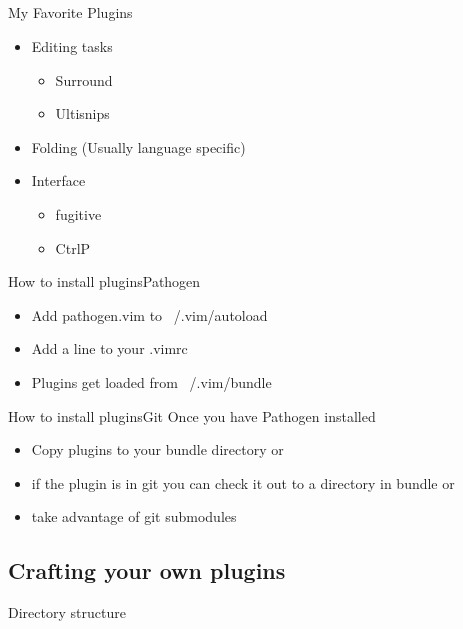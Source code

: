 \documentclass{beamer}
\begin{document}
    \subsection{}
    \begin{frame}{My Favorite Plugins}
        \begin{itemize}
            \item Editing tasks
                \begin{itemize}
                    \item Surround
                    \item Ultisnips
                \end{itemize}
            \item Folding (Usually language specific)
            \item Interface
                \begin{itemize}
                    \item fugitive
                    \item CtrlP
                \end{itemize}
        \end{itemize}
    \end{frame}
    \begin{frame}{How to install plugins}{Pathogen}
        \begin{itemize}
            \item Add pathogen.vim to ~/.vim/autoload
            \item Add a line to your .vimrc
            \item Plugins get loaded from ~/.vim/bundle
        \end{itemize}
    \end{frame}
    \begin{frame}{How to install plugins}{Git}
        Once you have Pathogen installed
        \begin{itemize}
            \item Copy plugins to your bundle directory or
            \item if the plugin is in git you can check it out to a directory in bundle or
            \item take advantage of git submodules
        \end{itemize}
    \end{frame}
    \subsection{Crafting your own plugins}
    \begin{frame}{Directory structure}
    \end{frame}
\end{document}

